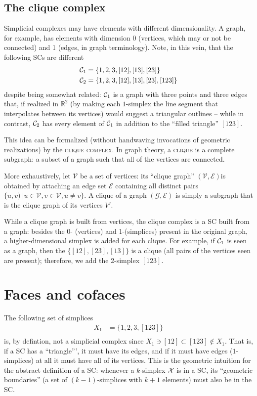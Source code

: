 \documentclass{tufte-handout}
\newcommand{\re}{\mathbb{R}}
\begin{document}
\subsection{The clique complex}
Simplicial complexes may have elements with different dimensionality. A graph, for example, has elements with dimension 0 (vertices, which may or not be connected) and 1 (edges, in graph terminology). Note, in this vein, that the following SCs are different
\begin{align*}
    \sc_1 &= \{1,2,3,[12],[13],[23]\}\\
    \sc_2 &= \{1,2,3,[12],[13],[23],[123]\}
\end{align*}
despite being somewhat related: $\sc_1$ is a graph with three points and three edges that, if realized in $\re^2$ (by making each $1$-simplex the line segment that interpolates between its vertices) would suggest a triangular outlines -- while in contrast, $\sc_2$ has every element of $\sc_1$ in addition to the ``filled triangle'' $[123]$. 

This idea can be formalized (without handwaving invocations of geometric realizations) by the \textsc{clique complex}. In graph theory, a \textsc{clique} is a complete subgraph: a subset of a graph such that all of the vertices are connected. 

More exhaustively,  let  $\mathcal V$ be a set of vertices: its ``clique graph'' $(\mathcal V, \mathcal E)$is obtained by attaching an edge set $\mathcal E$ containing all distinct pairs $\{u,v)\ | u\in \mathcal V, v \in \mathcal V, u\neq v\}$. A clique of a graph $(\mathcal G, \mathcal E)$ is simply a subgraph that is the clique graph of its vertices $V'$. 

While a clique graph is built from vertices, the clique complex is a SC built from a graph: besides the 0- (vertices) and 1-(simplices) present in the original graph, a higher-dimensional simplex is added for each clique. For example, if $\sc_1$ is seen as a graph, then the $\{[12],[23],[13]\}$ is a clique (all pairs of the vertices seen are present); therefore, we add the 2-simplex $[123]$. 


\section{Faces and cofaces}
The following set of simplices
\begin{align*}
    X_1 &= \{1,2,3,[123]\}\\
\end{align*}
is, by defintion, not a simplicial complex since $X_1 \ni [12]\subset [123]\not \in X_1$. That is,
if a SC has a ``triangle''', it must have its edges, and if it must have edges ($1$-simplices) at all it must have all of its vertices. This is the geometric intuition for the abstract definition of a SC:  whenever a $k$-simplex $\se$ is in a SC, its ``geometric boundaries'' (a set of $(k-1)$-simplices with $k+1$ elements) must also be in the SC. 
\end{document}
